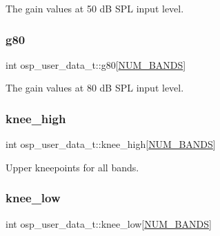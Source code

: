 The gain values at 50 dB S\+PL input level. 

\mbox{\label{structosp__user__data__t_a02d70968d64180808d46e4f76e066382}} 
\subsubsection{\texorpdfstring{g80}{g80}}
{\footnotesize\ttfamily int osp\+\_\+user\+\_\+data\+\_\+t\+::g80\mbox{[}\mbox{\hyperlink{constants_8h_a19441d7b9be72492ed93a440085e53be}{N\+U\+M\+\_\+\+B\+A\+N\+DS}}\mbox{]}}



The gain values at 80 dB S\+PL input level. 

\mbox{\label{structosp__user__data__t_a2564a1c5458026ce4a1532458886f5ab}} 
\subsubsection{\texorpdfstring{knee\+\_\+high}{knee\_high}}
{\footnotesize\ttfamily int osp\+\_\+user\+\_\+data\+\_\+t\+::knee\+\_\+high\mbox{[}\mbox{\hyperlink{constants_8h_a19441d7b9be72492ed93a440085e53be}{N\+U\+M\+\_\+\+B\+A\+N\+DS}}\mbox{]}}



Upper kneepoints for all bands. 

\mbox{\label{structosp__user__data__t_a8709446147e7d44c5b9cfabe9e51799e}} 
\subsubsection{\texorpdfstring{knee\+\_\+low}{knee\_low}}
{\footnotesize\ttfamily int osp\+\_\+user\+\_\+data\+\_\+t\+::knee\+\_\+low\mbox{[}\mbox{\hyperlink{constants_8h_a19441d7b9be72492ed93a440085e53be}{N\+U\+M\+\_\+\+B\+A\+N\+DS}}\mbox{]}}



